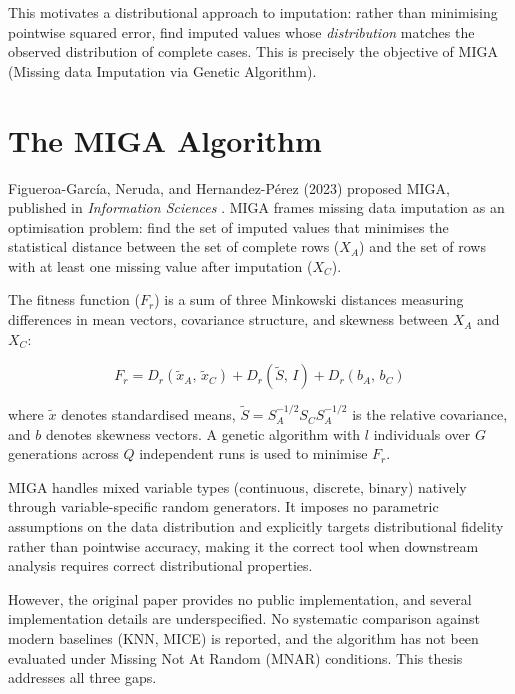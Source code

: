 This motivates a distributional approach to imputation: rather than minimising pointwise squared error, find imputed values whose \emph{distribution} matches the observed distribution of complete cases. This is precisely the objective of MIGA (Missing data Imputation via Genetic Algorithm).


\section{The MIGA Algorithm}

Figueroa-Garc\'ia, Neruda, and Hernandez-P\'erez (2023) proposed MIGA, published in \textit{Information Sciences} \cite{FigueroaGarcia2023}. MIGA frames missing data imputation as an optimisation problem: find the set of imputed values that minimises the statistical distance between the set of complete rows ($X_A$) and the set of rows with at least one missing value after imputation ($X_C$).

The fitness function ($F_r$) is a sum of three Minkowski distances measuring differences in mean vectors, covariance structure, and skewness between $X_A$ and $X_C$:

\begin{equation}
    F_r = D_r(\tilde{x}_A,\, \tilde{x}_C) + D_r(\tilde{S},\, I) + D_r(b_A,\, b_C)
    \label{eq:fr}
\end{equation}

where $\tilde{x}$ denotes standardised means, $\tilde{S} = S_A^{-1/2} S_C S_A^{-1/2}$ is the relative covariance, and $b$ denotes skewness vectors. A genetic algorithm with $l$ individuals over $G$ generations across $Q$ independent runs is used to minimise $F_r$.

MIGA handles mixed variable types (continuous, discrete, binary) natively through variable-specific random generators. It imposes no parametric assumptions on the data distribution and explicitly targets distributional fidelity rather than pointwise accuracy, making it the correct tool when downstream analysis requires correct distributional properties.

However, the original paper provides no public implementation, and several implementation details are underspecified. No systematic comparison against modern baselines (KNN, MICE) is reported, and the algorithm has not been evaluated under Missing Not At Random (MNAR) conditions. This thesis addresses all three gaps.

